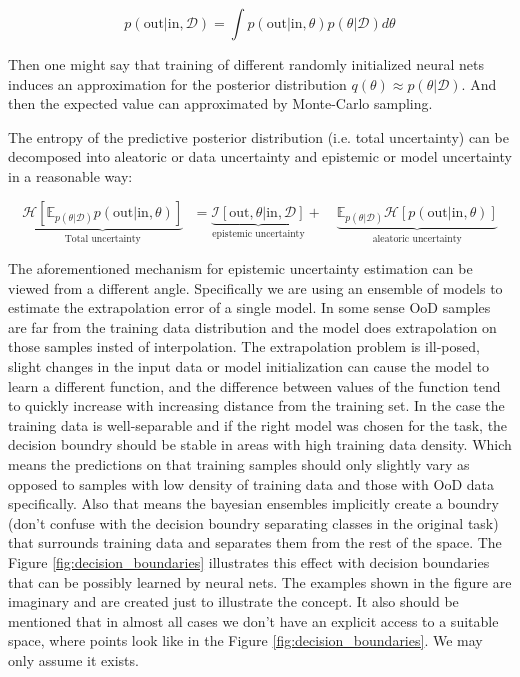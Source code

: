 \documentclass{article}
\begin{document}
    $$p( \textrm{out} | \textrm{in}, \mathcal{D}) = \int p( \textrm{out} | \textrm{in}, \theta) p(\theta | \mathcal{D}) d \theta$$

    Then one might say that training of different randomly initialized neural nets induces an approximation for the posterior distribution $q(\theta) \approx p(\theta | \mathcal{D})$. And then the expected value can approximated by Monte-Carlo sampling.

    The entropy of the predictive posterior distribution (i.e. total uncertainty) can be decomposed into aleatoric or data uncertainty and epistemic or model uncertainty in a reasonable way:

    $$\underbrace{\mathcal{H} [ \mathbb{E}_{p(\theta | \mathcal{D})} p (\textrm{out} | \textrm{in}, \theta) ]}_{\textrm{Total uncertainty}} \,\,\,\, = \underbrace{\mathcal{I}[ \textrm{out}, \theta | \textrm{in}, \mathcal{D} ]}_{\textrm{epistemic uncertainty}} + \,\,\,\,\,\, \underbrace{\mathbb{E}_{p(\theta | \mathcal{D})} \mathcal{H} [ p(\textrm{out} | \textrm{in}, \theta) ]}_{\textrm{aleatoric uncertainty}}$$

    The aforementioned mechanism for epistemic uncertainty estimation can be viewed from a different angle. Specifically we are using an ensemble of models to estimate the extrapolation error of a single model. In some sense OoD samples are far from the training data distribution and the model does extrapolation on those samples insted of interpolation. The extrapolation problem is ill-posed, slight changes in the input data or model initialization can cause the model to learn a different function, and the difference between values of the function tend to quickly increase with increasing distance from the training set. In the case the training data is well-separable and if the right model was chosen for the task, the decision boundry should be stable in areas with high training data density. Which means the predictions on that training samples should only slightly vary as opposed to samples with low density of training data and those with OoD data specifically. Also that means the bayesian ensembles implicitly create a boundry (don't confuse with the decision boundry separating classes in the original task) that surrounds training data and separates them from the rest of the space. The Figure \ref{fig:decision_boundaries} illustrates this effect with decision boundaries that can be possibly learned by neural nets. The examples shown in the figure are imaginary and are created just to illustrate the concept. It also should be mentioned that in almost all cases we don't have an explicit access to a suitable space, where points look like in the Figure \ref{fig:decision_boundaries}. We may only assume it exists.
\end{document}
